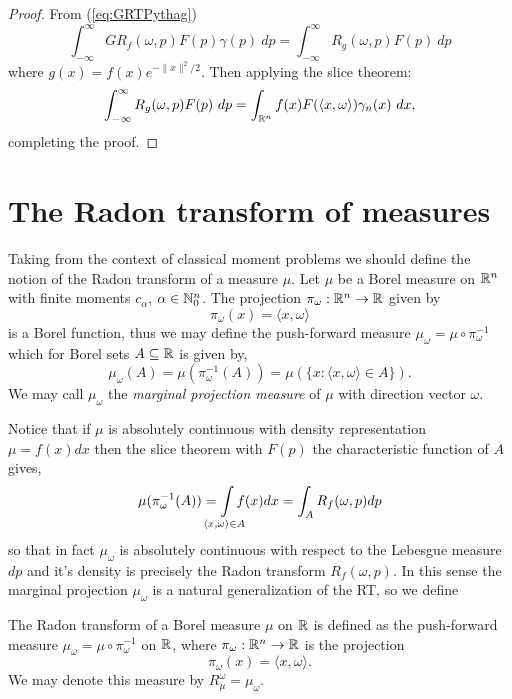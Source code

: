 \begin{proof}
  From (\ref{eq:GRTPythag})
  \[
    \int_{-\infty}^\infty GR_f(\omega, p) F(p) \gamma(p) ~dp 
    = \int_{-\infty}^\infty R_g(\omega, p) F(p) ~dp
  \]
  where $g(x) = f(x)e^{-\|x\|^2/2}$. Then applying the slice theorem:
  \[
    \int_{-\infty}^\infty R_g(\omega, p) F(p) ~dp 
    = \int_{\mathbb{R}^n} f(x)F(\langle x, \omega \rangle) \gamma_n(x) ~dx,
  \]
  completing the proof.
\end{proof}


\section{The Radon transform of measures}\label{sec:RTmeasure}


Taking from the context of classical moment problems we should define the notion of the Radon transform of a measure $\mu$. Let $\mu$ be a Borel measure on $\mathbb{R}^n$ with finite moments $c_\alpha$, $\alpha \in \mathbb{N}_0^n$. The projection $\pi_\omega : \mathbb{R}^n \rightarrow \mathbb{R}$ given by
\[
  \pi_\omega(x) = \langle x, \omega \rangle
\] 
is a Borel function, thus we may define the push-forward measure $\mu_\omega = \mu \circ \pi_\omega^{-1}$ which for Borel sets $A \subseteq \mathbb{R}$ is given by,
\[
  \mu_\omega(A) = \mu(\pi_\omega^{-1}(A)) = \mu(\{x : \langle x, \omega \rangle \in A\}).
\]
We may call $\mu_\omega$ the \emph{marginal projection measure} of $\mu$ with direction vector $\omega$.

Notice that if $\mu$ is absolutely continuous with density representation $\mu = f(x)dx$ then the slice theorem with $F(p)$ the characteristic function of $A$ gives,
\[
  \mu(\pi_\omega^{-1}(A)) = \int\mclimits_{\langle x, \omega \rangle \in A} f(x)dx = \int_A R_f(\omega, p) dp
\]
so that in fact $\mu_\omega$ is absolutely continuous with respect to the Lebesgue measure $dp$ and it's density is precisely the Radon transform $R_f(\omega, p)$. In this sense the marginal projection $\mu_\omega$ is a natural generalization of the RT, so we define

\begin{definition}
  The Radon transform of a Borel measure $\mu$ on $\mathbb{R}$ is defined as the push-forward measure $\mu_\omega = \mu \circ \pi_\omega^{-1}$ on $\mathbb{R}$, where $\pi_\omega: \mathbb{R}^n \rightarrow \mathbb{R}$ is the projection 
  \[
    \pi_\omega(x) = \langle x, \omega \rangle.
  \]
  We may denote this measure by $R_\mu^\omega = \mu_\omega$.
\end{definition}

